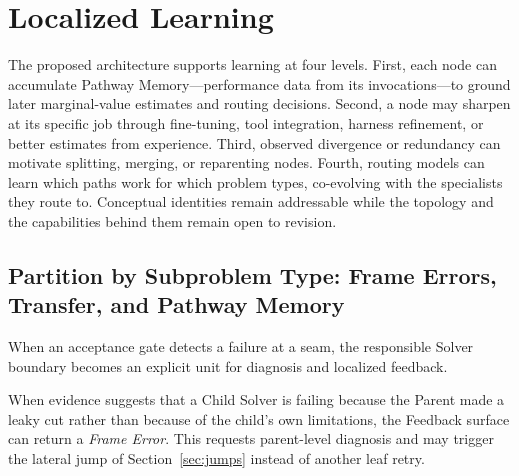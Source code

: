\documentclass[11pt]{article}
\begin{document}
\section{Localized Learning}
\label{sec:learning}

The proposed architecture supports learning at four levels. First, each node can accumulate Pathway Memory---performance data from its invocations---to ground later marginal-value estimates and routing decisions. Second, a node may sharpen at its specific job through fine-tuning, tool integration, harness refinement, or better estimates from experience. Third, observed divergence or redundancy can motivate splitting, merging, or reparenting nodes. Fourth, routing models can learn which paths work for which problem types, co-evolving with the specialists they route to. Conceptual identities remain addressable while the topology and the capabilities behind them remain open to revision.

\subsection{Partition by Subproblem Type: Frame Errors, Transfer, and Pathway Memory}
\label{sec:partition}

When an acceptance gate detects a failure at a seam, the responsible Solver boundary becomes an explicit unit for diagnosis and localized feedback.

When evidence suggests that a Child Solver is failing because the Parent made a leaky cut rather than because of the child's own limitations, the Feedback surface can return a \emph{Frame Error}. This requests parent-level diagnosis and may trigger the lateral jump of Section~\ref{sec:jumps} instead of another leaf retry.
\end{document}
